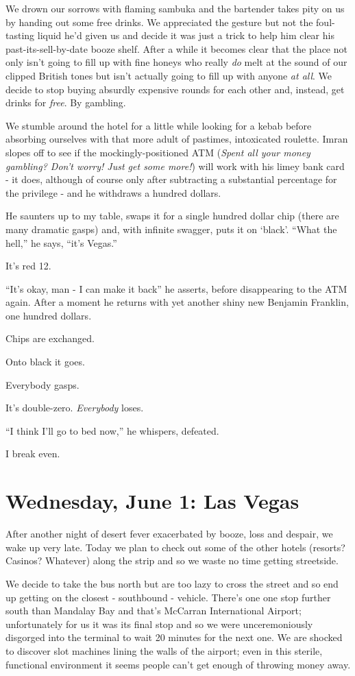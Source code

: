 \documentclass[a5paper,titlepage,11pt]{book}
\begin{document}
We drown our sorrows with flaming sambuka and the bartender takes pity on us by handing out some free drinks. We appreciated the gesture but not the foul-tasting liquid he'd given us and decide it was just a trick to help him clear his past-its-sell-by-date booze shelf. After a while it becomes clear that the place not only isn't going to fill up with fine honeys who really \emph{do} melt at the sound of our clipped British tones but isn't actually going to fill up with anyone \emph{at all}. We decide to stop buying absurdly expensive rounds for each other and, instead, get drinks for \emph{free}. By gambling.

We stumble around the hotel for a little while looking for a kebab before absorbing ourselves with that more adult of pastimes, intoxicated roulette. Imran slopes off to see if the mockingly-positioned ATM (\emph{Spent all your money gambling?  Don't worry!  Just get some more!}) will work with his limey bank card - it does, although of course only after subtracting a substantial percentage for the privilege - and he withdraws a hundred dollars.

He saunters up to my table, swaps it for a single hundred dollar chip (there are many dramatic gasps) and, with infinite swagger, puts it on `black'. ``What the hell,'' he says, ``it's Vegas.''

It's red 12.

``It's okay, man - I can make it back'' he asserts, before disappearing to the ATM again. After a moment he returns with yet another shiny new Benjamin Franklin, one hundred dollars.

Chips are exchanged.

Onto black it goes.

Everybody gasps.

It's double-zero. \emph{Everybody} loses.

``I think I'll go to bed now,'' he whispers, defeated.

I break even.

\chapter[Las Vegas]{Wednesday, June 1: Las Vegas}
After another night of desert fever exacerbated by booze, loss and despair, we wake up very late. Today we plan to check out some of the other hotels (resorts? Casinos?  Whatever) along the strip and so we waste no time getting streetside.

We decide to take the bus north but are too lazy to cross the street and so end up getting on the closest - southbound - vehicle. There's one one stop further south than Mandalay Bay and that's McCarran International Airport; unfortunately for us it was its final stop and so we were unceremoniously disgorged into the terminal to wait 20 minutes for the next one. We are shocked to discover slot machines lining the walls of the airport; even in this sterile, functional environment it seems people can't get enough of throwing money away.
\end{document}
